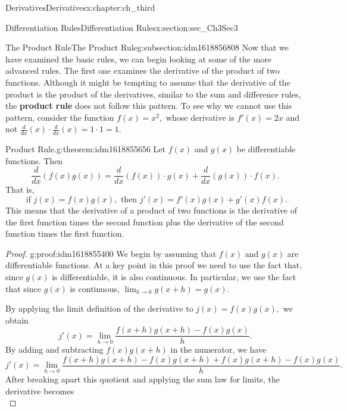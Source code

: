 \documentclass[oneside,10pt,]{book}
\newcommand{\terminology}[1]{\textbf{#1}}
\numberwithin{equation}{section}
\begin{document}
\begin{chapterptx}{Derivatives}{}{Derivatives}{}{}{x:chapter:ch_third}
\begin{sectionptx}{Differentiation Rules}{}{Differentiation Rules}{}{}{x:section:sec_Ch3Sec3}
\typeout{************************************************}
%
\begin{subsectionptx}{The Product Rule}{}{The Product Rule}{}{}{g:subsection:idm1618856808}
Now that we have examined the basic rules, we can begin looking at some of the more advanced rules. The first one examines the derivative of the product of two functions. Although it might be tempting to assume that the derivative of the product is the product of the derivatives, similar to the sum and difference rules, the \terminology{product rule} does not follow this pattern. To see why we cannot use this pattern, consider the function \(f(x)=x^2,\) whose derivative is \(f'(x)=2x\) and not \(\frac{d}{dx}(x)\cdot \frac{d}{dx}(x)=1\cdot 1=1.\)%
\begin{theorem}{Product Rule.}{}{g:theorem:idm1618855656}%
Let \(f(x)\) and \(g(x)\) be differentiable functions. Then%
%
\begin{equation*}
\frac{d}{dx}(f(x)g(x))=\frac{d}{dx}(f(x))\cdot g(x)+\frac{d}{dx}(g(x))\cdot f(x).
\end{equation*}
That is,%
%
\begin{equation*}
\text{ if } j(x)=f(x)g(x),\text{ then } j'(x)=f'(x)g(x)+g'(x)f(x).
\end{equation*}
This means that the derivative of a product of two functions is the derivative of the first function times the second function plus the derivative of the second function times the first function.%
\end{theorem}
\begin{proof}{}{g:proof:idm1618855400}
We begin by assuming that \(f(x)\) and \(g(x)\) are differentiable functions. At a key point in this proof we need to use the fact that, since \(g(x)\) is differentiable, it is also continuous. In particular, we use the fact that since \(g(x)\) is continuous, \(\lim_{h\to 0}g(x+h)=g(x).\)%
\par
By applying the limit definition of the derivative to \(j(x)=f(x)g(x),\) we obtain%
%
\begin{equation*}
j'(x)=\lim_{h\to 0}\frac{f(x+h)g(x+h)-f(x)g(x)}{h}.
\end{equation*}
By adding and subtracting \(f(x)g(x+h)\) in the numerator, we have%
%
\begin{equation*}
j'(x)=\lim_{h\to 0}\frac{f(x+h)g(x+h)-f(x)g(x+h)+f(x)g(x+h)-f(x)g(x)}{h}.
\end{equation*}
After breaking apart this quotient and applying the sum law for limits, the derivative becomes%
%
\begin{equation*}

\end{equation*}
\end{proof}
\end{subsectionptx}
\end{sectionptx}
\end{chapterptx}
\end{document}
